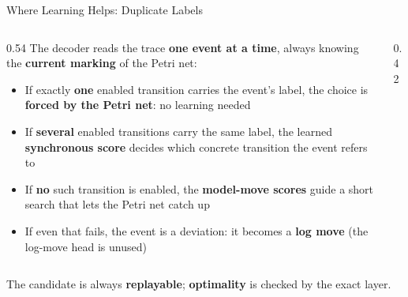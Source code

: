 \documentclass[aspectratio=169]{beamer}
\newcommand{\keyc}[1]{\textbf{\textcolor{larablue}{#1}}}
\newcommand{\keyg}[1]{\textbf{\textcolor{laraaqua!70!black}{#1}}}
\newcommand{\keya}[1]{\textbf{\textcolor{laraamber!85!black}{#1}}}
\begin{document}
\begin{frame}{Where Learning Helps: Duplicate Labels}
  \begin{columns}[T]
  \begin{column}{0.54\textwidth}
    \small
    The decoder reads the trace \keyc{one event at a time}, always knowing
    the \keyc{current marking} of the Petri net:
    \begin{itemize}\setlength{\itemsep}{4pt}
      \item If exactly \keyg{one} enabled transition carries the event's label,
        the choice is \keyg{forced by the Petri net}: no learning needed
      \item If \keyc{several} enabled transitions carry the same label,
        the learned \keyc{synchronous score} decides which concrete
        transition the event refers to
      \item If \keyc{no} such transition is enabled, the \keyc{model-move
        scores} guide a short search that lets the Petri net catch up
      \item If even that fails, the event is a deviation:
        it becomes a \keya{log move} (the log-move head is unused)
    \end{itemize}
  \end{column}
  \begin{column}{0.42\textwidth}
    \begin{center}
    \end{center}
  \end{column}
  \end{columns}
  \vspace{1mm}
  \centering \small
  The candidate is always \keyg{replayable}; \keyg{optimality} is checked by the exact layer.
\end{frame}
\end{document}
